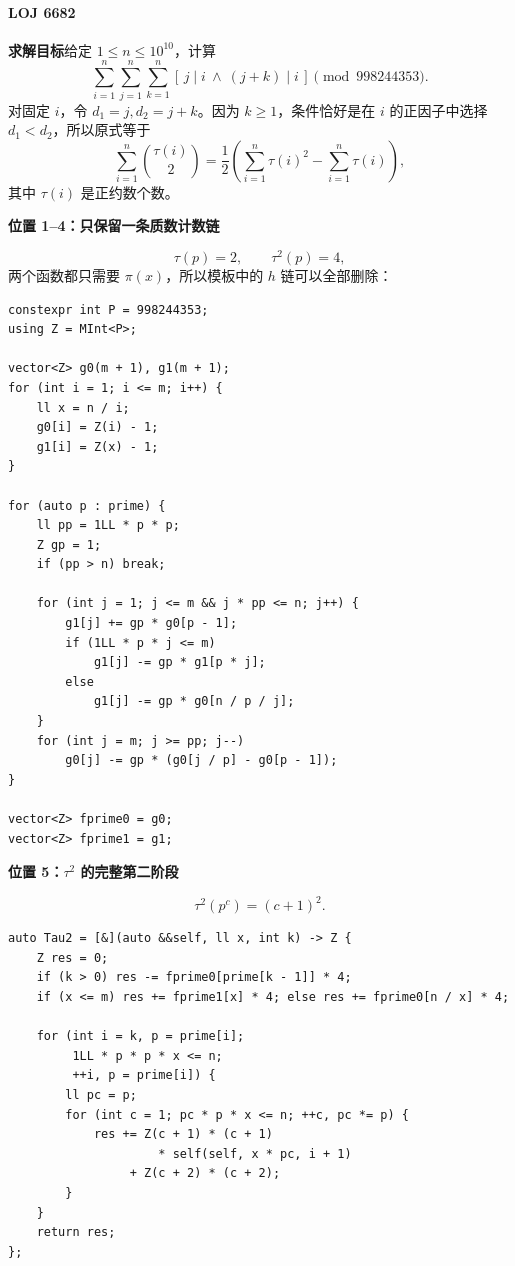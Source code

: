 \paragraph*{LOJ 6682}

\textbf{求解目标}\quad 给定 \(1\le n\le10^{10}\)，计算
\[
\sum_{i=1}^{n}\sum_{j=1}^{n}\sum_{k=1}^{n}
[\,j\mid i\ \land\ (j+k)\mid i\,]\pmod {998244353}.
\]
对固定 \(i\)，令 \(d_1=j,d_2=j+k\)。因为 \(k\ge1\)，条件恰好是在 \(i\)
的正因子中选择 \(d_1<d_2\)，所以原式等于
\[
\sum_{i=1}^{n}\binom{\tau(i)}2
=\frac12\left(
\sum_{i=1}^{n}\tau(i)^2-\sum_{i=1}^{n}\tau(i)
\right),
\]
其中 \(\tau(i)\) 是正约数个数。

\textbf{位置 1--4：只保留一条质数计数链}

\[
\tau(p)=2,\qquad \tau^2(p)=4,
\]
两个函数都只需要 \(\pi(x)\)，所以模板中的 \(h\) 链可以全部删除：

\begin{verbatim}
constexpr int P = 998244353;
using Z = MInt<P>;

vector<Z> g0(m + 1), g1(m + 1);
for (int i = 1; i <= m; i++) {
    ll x = n / i;
    g0[i] = Z(i) - 1;
    g1[i] = Z(x) - 1;
}

for (auto p : prime) {
    ll pp = 1LL * p * p;
    Z gp = 1;
    if (pp > n) break;

    for (int j = 1; j <= m && j * pp <= n; j++) {
        g1[j] += gp * g0[p - 1];
        if (1LL * p * j <= m)
            g1[j] -= gp * g1[p * j];
        else
            g1[j] -= gp * g0[n / p / j];
    }
    for (int j = m; j >= pp; j--)
        g0[j] -= gp * (g0[j / p] - g0[p - 1]);
}

vector<Z> fprime0 = g0;
vector<Z> fprime1 = g1;
\end{verbatim}

\textbf{位置 5：\(\tau^2\) 的完整第二阶段}

\[
\tau^2(p^c)=(c+1)^2.
\]

\begin{verbatim}
auto Tau2 = [&](auto &&self, ll x, int k) -> Z {
    Z res = 0;
    if (k > 0) res -= fprime0[prime[k - 1]] * 4;
    if (x <= m) res += fprime1[x] * 4; else res += fprime0[n / x] * 4;

    for (int i = k, p = prime[i];
         1LL * p * p * x <= n;
         ++i, p = prime[i]) {
        ll pc = p;
        for (int c = 1; pc * p * x <= n; ++c, pc *= p) {
            res += Z(c + 1) * (c + 1)
                     * self(self, x * pc, i + 1)
                 + Z(c + 2) * (c + 2);
        }
    }
    return res;
};
\end{verbatim}

